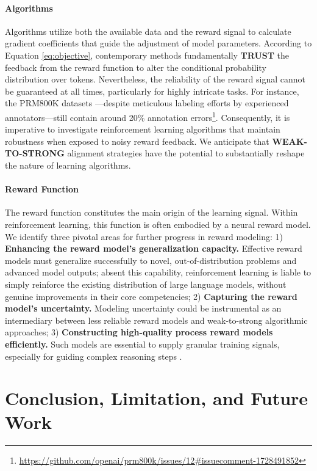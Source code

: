 \begin{itemize}[topsep=0pt]
\paragraph{Algorithms} Algorithms utilize both the available data and the reward signal to calculate gradient coefficients that guide the adjustment of model parameters. According to Equation \ref{eq:objective}, contemporary methods fundamentally \textbf{TRUST} the feedback from the reward function to alter the conditional probability distribution over tokens. Nevertheless, the reliability of the reward signal cannot be guaranteed at all times, particularly for highly intricate tasks. For instance, the PRM800K datasets \citep{lightman2023let}—despite meticulous labeling efforts by experienced annotators—still contain around 20\% annotation errors\footnote{\url{https://github.com/openai/prm800k/issues/12\#issuecomment-1728491852}}. Consequently, it is imperative to investigate reinforcement learning algorithms that maintain robustness when exposed to noisy reward feedback. We anticipate that \textbf{WEAK-TO-STRONG} alignment strategies \citep{burns2023weak} have the potential to substantially reshape the nature of learning algorithms.

\paragraph{Reward Function} The reward function constitutes the main origin of the learning signal. Within reinforcement learning, this function is often embodied by a neural reward model. We identify three pivotal areas for further progress in reward modeling: 1) \textbf{Enhancing the reward model’s generalization capacity.} Effective reward models must generalize successfully to novel, out-of-distribution problems and advanced model outputs; absent this capability, reinforcement learning is liable to simply reinforce the existing distribution of large language models, without genuine improvements in their core competencies; 2) \textbf{Capturing the reward model’s uncertainty.} Modeling uncertainty could be instrumental as an intermediary between less reliable reward models and weak-to-strong algorithmic approaches; 3) \textbf{Constructing high-quality process reward models efficiently.} Such models are essential to supply granular training signals, especially for guiding complex reasoning steps \citep{lightman2023let,wang2023math}.

\section{Conclusion, Limitation, and Future Work}


\end{itemize}
